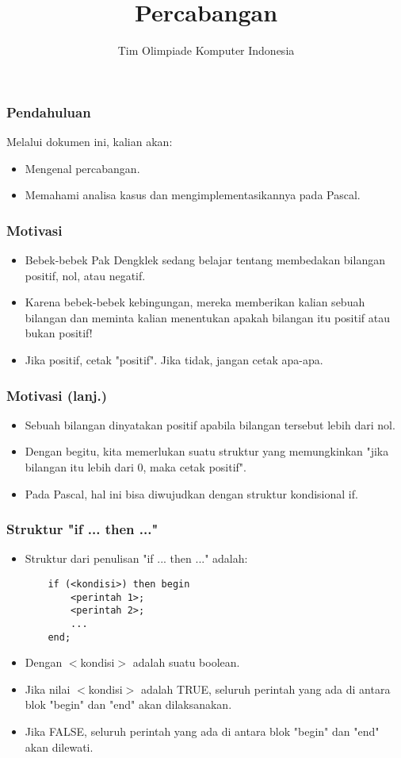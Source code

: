 \documentclass{beamer}
\title{Percabangan}
\author{Tim Olimpiade Komputer Indonesia}
\begin{document}
\begin{frame}
\titlepage
\end{frame}

\begin{frame}
\frametitle{Pendahuluan}
Melalui dokumen ini, kalian akan:
\begin{itemize}
	\item Mengenal percabangan.
	\item Memahami analisa kasus dan mengimplementasikannya pada Pascal.
\end{itemize}
\end{frame}

\begin{frame}
\frametitle{Motivasi}
\begin{itemize}
	\item Bebek-bebek Pak Dengklek sedang belajar tentang membedakan bilangan positif, nol, atau negatif.
	\item Karena bebek-bebek kebingungan, mereka memberikan kalian sebuah bilangan dan meminta kalian menentukan apakah bilangan itu positif atau bukan positif!
	\item Jika positif, cetak "positif". Jika tidak, jangan cetak apa-apa.
\end{itemize}
\end{frame}

\begin{frame}
\frametitle{Motivasi (lanj.)}
\begin{itemize}
	\item Sebuah bilangan dinyatakan positif apabila bilangan tersebut lebih dari nol. 
	\item Dengan begitu, kita memerlukan suatu struktur yang memungkinkan "\alert{jika} bilangan itu lebih dari 0, \alert{maka} cetak positif".
	\item Pada Pascal, hal ini bisa diwujudkan dengan struktur kondisional \alert{if}.
\end{itemize}
\end{frame}

\begin{frame}[fragile]
\frametitle{Struktur "if ... then ..."}
\begin{itemize}
	\item Struktur dari penulisan "if ... then ..." adalah:
	\begin{lstlisting}
	if (<kondisi>) then begin
	    <perintah 1>;
	    <perintah 2>;
	    ...
	end;
	\end{lstlisting}
	
	\item Dengan $<$kondisi$>$ adalah suatu boolean.
	\item Jika nilai $<$kondisi$>$ adalah TRUE, seluruh perintah yang ada di antara blok "begin" dan "end" akan dilaksanakan.
	\item Jika FALSE, seluruh perintah yang ada di antara blok "begin" dan "end" akan dilewati.
\end{itemize}
\end{frame}
\end{document}
